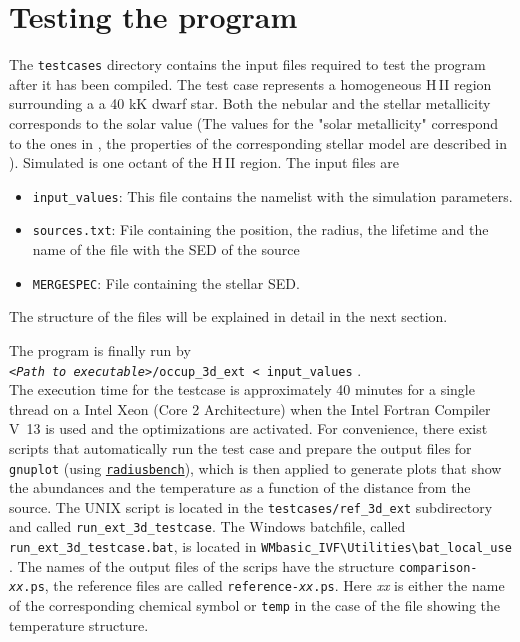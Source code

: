\documentclass[a4paper,10pt]{article}
\begin{document}
\section{Testing the program}
The \texttt{testcases} directory contains the input files required to test the 
program after it has been compiled. The test case represents a homogeneous 
H\,II region surrounding a a 40 kK dwarf star. Both the nebular and the stellar 
metallicity corresponds to the solar value (The values for the "solar 
metallicity" correspond to the ones in \citealt{Asplund2009}, the properties of 
the corresponding stellar model are described in \citealt{Weber2015}). Simulated 
is one octant of the H\,II region. The input files are
\begin{itemize}
\item \texttt{input\_values}: This file contains the namelist with the  
simulation parameters.
\item \texttt{sources.txt}: File containing the position, the radius, the  
lifetime and the name of the file with the SED of the source
\item \texttt{MERGESPEC}: File containing the stellar SED.
\end{itemize}
The structure of the files will be explained in detail in the next section.

The program is finally run by\\
\texttt{\textit{<Path to executable>}/occup\_3d\_ext < input\_values} . \\
The execution time for the testcase is approximately 40 minutes for a single  
thread on a Intel Xeon (Core 2 Architecture) when the Intel Fortran Compiler 
V~13 is used and the optimizations are activated. 
For convenience, there exist scripts that automatically run the test case and  
prepare the output files for \texttt{gnuplot} 
(using \texttt{\hyperref[util:radiusbench]{radiusbench}}), 
which is then applied to generate plots that show the abundances  and the  
temperature as a function of the distance from the source.
The UNIX script is located in the \texttt{testcases/ref\_3d\_ext}  subdirectory 
and called \texttt{run\_ext\_3d\_testcase}. The Windows batchfile, called  
\texttt{run\_ext\_3d\_testcase.bat}, is located in 
\texttt{WMbasic\_IVF\textbackslash Utilities\textbackslash bat\_local\_use} .
The names of the output files of the scrips have the structure  
\texttt{comparison-\textit{xx}.ps}, the reference files are called 
\texttt{reference-\textit{xx}.ps}. Here \textit{xx} is either the
name of the corresponding chemical symbol or \texttt{temp} in the case of the	 
file showing the temperature structure.
\end{document}
